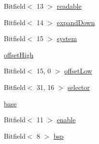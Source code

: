 \begin{DoxyCompactItemize}
\item 
Bitfield$<$ 13 $>$ \hyperlink{namespaceX86ISA_a52cbc8d1426aa3586acf6def44526ed0}{readable}
\item 
Bitfield$<$ 14 $>$ \hyperlink{namespaceX86ISA_a33304412ade61b5bca30e94dc472de6b}{expandDown}
\item 
Bitfield$<$ 15 $>$ \hyperlink{namespaceX86ISA_a400778a664a4822401bb6677e1cef9c3}{system}
\item 
\hyperlink{namespaceX86ISA_ac6047d8218946eabcf7d9a789fe03d7c}{offsetHigh}
\item 
Bitfield$<$ 15, 0 $>$ \hyperlink{namespaceX86ISA_aba42d08026276e11c74518f651744f33}{offsetLow}
\item 
Bitfield$<$ 31, 16 $>$ \hyperlink{namespaceX86ISA_a94c9f56283a29c6a5dcd42d7c0d18dec}{selector}
\item 
\hyperlink{namespaceX86ISA_a22fd87812cbb48f6d80b6cc7957490cf}{base}
\item 
Bitfield$<$ 11 $>$ \hyperlink{namespaceX86ISA_a240abf52b962b44d8f18aad15edace65}{enable}
\item 
Bitfield$<$ 8 $>$ \hyperlink{namespaceX86ISA_af18c00627819c09b6425eb397d13a11f}{bsp}
\end{DoxyCompactItemize}
